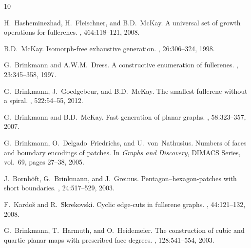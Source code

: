 \documentclass[11pt,a4paper]{article}
\theoremstyle{definition}
\begin{document}
\begin{thebibliography}{10}

H.~Hasheminezhad, H.~Fleischner, and B.D.~McKay.
\newblock A universal set of growth operations for fullerenes.
, 464:118--121, 2008.

B.D.~McKay.
\newblock Isomorph-free exhaustive generation.
, 26:306--324, 1998.

G.~Brinkmann and A.W.M.~Dress.
\newblock A constructive enumeration of fullerenes.
, 23:345--358, 1997.

G.~Brinkmann, J.~Goedgebeur, and B.D.~McKay.
\newblock The smallest fullerene without a spiral.
, 522:54--55, 2012.

G.~Brinkmann and B.D.~McKay.
\newblock Fast generation of planar graphs.
,
  58:323--357, 2007.

G.~Brinkmann, O.~Delgado~Friedrichs, and U.~von~Nathusius.
\newblock Numbers of faces and boundary encodings of patches.
\newblock In {\em Graphs and Discovery}, DIMACS Series, vol.~69, pages 27--38,
  2005.

J.~Bornh\"oft, G.~Brinkmann, and J.~Greinus.
\newblock Pentagon--hexagon-patches with short boundaries.
, 24:517--529, 2003.

F.~Kardo\u{s} and R.~\u{S}krekovski.
\newblock Cyclic edge-cuts in fullerene graphs.
, 44:121--132, 2008.

G.~Brinkmann, T.~Harmuth, and O.~Heidemeier.
\newblock The construction of cubic and quartic planar maps with prescribed face degrees.
, 128:541--554, 2003.

\end{thebibliography}
\end{document}
